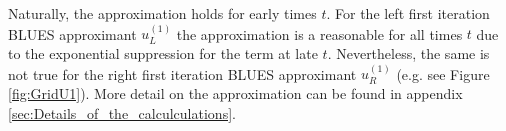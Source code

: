 \documentclass[amsmath,amssymb,amsfonts,aps,pre,preprint,superscriptaddress,bibnotes,showpacs,showkeys,longbibliography]{revtex4-1}
\begin{document}
Naturally, the approximation holds for early times $t$. For the left first iteration BLUES approximant $u^{(1)}_L$ the approximation is a reasonable for all  times $t$ due to the exponential suppression for the term at late $t$. Nevertheless, the same is not true for the right first iteration BLUES approximant $u^{(1)}_R$ (e.g. see Figure \ref{fig:GridU1}). More detail on the approximation can be found in appendix \ref{sec:Details_of_the_calculculations}.
\end{document}
